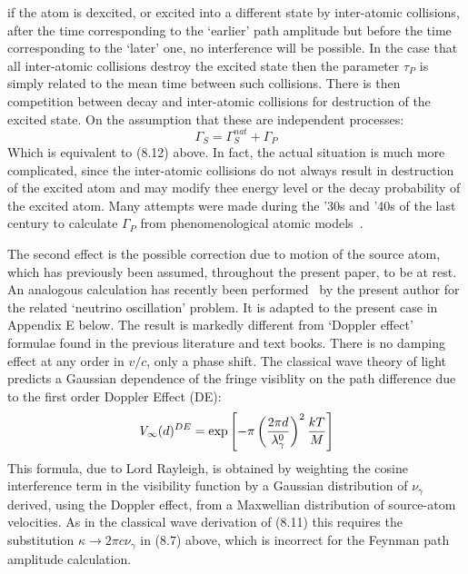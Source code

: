 \documentclass [12pt]{article}
\begin{document}
{    if the atom is dexcited, or excited into a different state by inter-atomic collisions, after the time
    corresponding to the `earlier'  path amplitude but before the time corresponding to the
    `later' one, no interference will be possible. In the case that all inter-atomic collisions
     destroy the excited state then the parameter $\tau_P$ is simply related to the mean time
   between such collisions. There is then competition between decay and inter-atomic collisions
   for destruction of the excited state. On the assumption that these are independent processes:
      \begin{equation}
       \Gamma_S  =   \Gamma_S^{nat} +   \Gamma_P 
     \end{equation}
    Which is equivalent to (8.12) above. In fact, the actual situation is much more complicated, since the
    inter-atomic collisions do not always result in destruction of the excited atom and may modify thee
    energy level or the decay probability of the excited atom.
     Many attempts were made during the '30s and '40s of the last century to calculate $\Gamma_P$
     from phenomenological atomic models~\cite{Linewidth,Lineshape}.

    \par The second effect is the possible correction due to motion of the source atom, 
    which has previously been assumed, throughout the present paper,
     to be at rest. An analogous calculation has recently been performed~\cite{JHF2} by the present
    author for the related `neutrino oscillation' problem. It is adapted to the present case in 
     Appendix E below. The result is markedly different from `Doppler effect' formulae found in 
     the previous literature and text books. There is no damping effect at any order in $v/c$, 
    only a phase shift.
     The classical wave theory of light predicts a Gaussian dependence of the fringe visiblity
     on the path difference due to the first order Doppler Effect (DE):
      \begin{equation}
       {\it V}_{\infty}(d)^{DE} = \exp \left[-\pi\left(\frac{2 \pi d}{\lambda_{\gamma}^0}\right)^2 \frac{kT}{M} \right]
      \end{equation}
       This formula, due to Lord Rayleigh, is obtained by weighting the cosine interference term in the visibility
      function by a Gaussian distribution of $\nu_{\gamma}$ derived, using the Doppler effect, from a Maxwellian
     distribution of source-atom velocities. As in the classical wave derivation of (8.11) this requires the
     substitution  $\kappa \rightarrow 2 \pi c \nu_{\gamma}$ in (8.7) above, which is incorrect for
    the Feynman path amplitude calculation.

}
\end{document}
